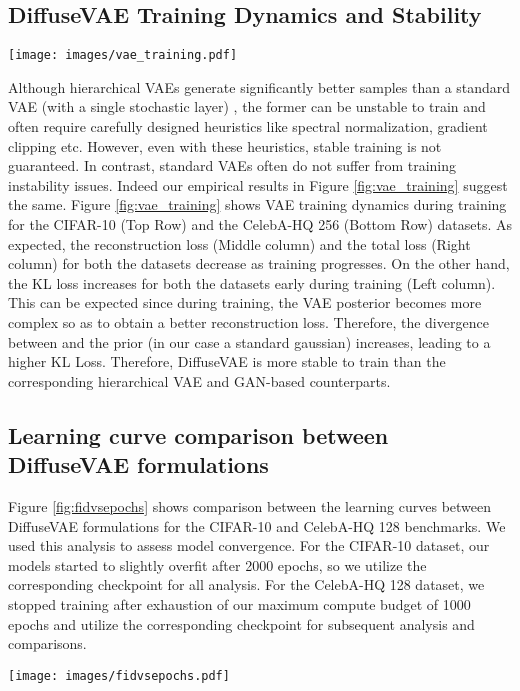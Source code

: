 \documentclass[10pt]{article} \usepackage[accepted]{tmlr}
\begin{document}
\subsection{DiffuseVAE Training Dynamics and Stability}

\begin{figure*}
  \centering
    \texttt{[image: images/vae\_training.pdf]}
    \caption{Illustration of VAE training dynamics on the CIFAR-10 (Top Row) and the CelebA-HQ 256 dataset (Bottom Row) datasets. The columns from left to right represent the variation in KL loss, Reconstruction Loss and Total Loss during training respectively.}
    \label{fig:vae_training}
\end{figure*}
Although hierarchical VAEs \citep{vahdat2021nvae, child2021deep} generate significantly better samples than a standard VAE (with a single stochastic layer) \citep{kingma2014autoencoding}, the former can be unstable to train and often require carefully designed heuristics like spectral normalization, gradient clipping etc. However, even with these heuristics, stable training is not guaranteed. In contrast, standard VAEs often do not suffer from training instability issues. Indeed our empirical results in Figure \ref{fig:vae_training} suggest the same. Figure \ref{fig:vae_training} shows VAE training dynamics during training for the CIFAR-10 (Top Row) and the CelebA-HQ 256 (Bottom Row) datasets. As expected, the reconstruction loss (Middle column) and the total loss (Right column) for both the datasets decrease as training progresses. On the other hand, the KL loss increases for both the datasets early during training (Left column). This can be expected since during training, the VAE posterior  becomes more complex so as to obtain a better reconstruction loss. Therefore, the divergence between  and the prior  (in our case a standard gaussian) increases, leading to a higher KL Loss. Therefore, DiffuseVAE is more stable to train than the corresponding hierarchical VAE and GAN-based counterparts.

\subsection{Learning curve comparison between DiffuseVAE formulations}
Figure \ref{fig:fidvsepochs} shows comparison between the learning curves between DiffuseVAE formulations for the CIFAR-10 and CelebA-HQ 128 benchmarks. We used this analysis to assess model convergence. For the CIFAR-10 dataset, our models started to slightly overfit after 2000 epochs, so we utilize the corresponding checkpoint for all analysis. For the CelebA-HQ 128 dataset, we stopped training after exhaustion of our maximum compute budget of 1000 epochs and utilize the corresponding checkpoint for subsequent analysis and comparisons.
\begin{figure*}[h]
  \centering
    \texttt{[image: images/fidvsepochs.pdf]}
    \caption{Learning curve (FID vs epochs) comparison between DiffuseVAE formulations for the CIFAR-10 (Left) and the CelebA-HQ-128 dataset (Right). T=1000 during inference}
    \label{fig:fidvsepochs}
\end{figure*}
\end{document}
